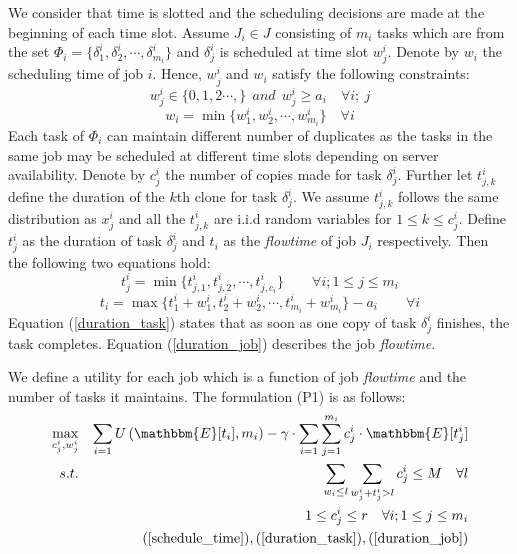 \documentclass[10pt,conference]{IEEEtran}
\begin{document}
We consider that time is slotted and the scheduling decisions are made at the beginning of  each time slot. Assume $J_i \in J$ consisting of $m_i$ tasks which are from the set $\Phi_i = \{\delta^i_1,\delta^i_2,\cdots,\delta^i_{m_i}\}$ and $\delta^i_j$ is scheduled at time slot $w^i_j$. Denote by $w_i$ the scheduling time of job $i$. Hence, $w^i_j$ and $w_i$ satisfy the following constraints:
\begin{equation}
w^i_j \in \{0,1,2\cdots,\} \ \ and \ \ w^i_j \geq a_i   \quad  \forall i; \ j
\label{schedule_time}
\end{equation}
\begin{equation}
w_i = \min\{w^i_1,w^i_2,\cdots,w^i_{m_i}\}   \quad  \forall i
\end{equation}
Each task of $\Phi_i$ can maintain different number of duplicates as the tasks in the same job may be scheduled at different time slots depending on server availability. Denote by $c^i_j$ the number of copies made for task $\delta^i_j$. Further let $t^i_{j,k}$ define the duration of the $k$th clone for task $\delta^i_j$. We assume $t^i_{j,k}$ follows the same distribution as $x^i_j$ and  all the $t^i_{j,k}$  are i.i.d random variables for $1\leq k \leq c^i_j$.  Define $t_j^i$ as the duration of task $\delta^i_j$ and $t_i$ as the \textit{flowtime} of job $J_i$ respectively.  Then the following two equations hold:
\begin{equation}
t^i_j =  \min\{t^i_{j,1}, t^i_{j,2}, \cdots, t^i_{j,c_i}\} \qquad \forall i; 1 \leq j \leq m_i
\label{duration_task}
\end{equation}
\begin{equation}
t_i =  \max\{t^i_{1} + w^i_1, t^i_{2} + w^i_2, \cdots, t^i_{m_i} + w^i_{m_i}\}  - a_i\qquad   \forall i
\label{duration_job}
\end{equation}
Equation (\ref{duration_task}) states that as soon as one copy of task $\delta^i_j$ finishes, the task completes. Equation (\ref{duration_job}) describes the job \textit{flowtime}.

We define a utility for each job which is a function of job \textit{flowtime} and the number of tasks it maintains. The formulation (P1) is as follows:
\begin{eqnarray*}
\max_{c^i_j,w^i_j}  &  &  \sum_{i = 1} U\left( \mathbbm{E}[t_i],m_i\right) - \gamma\cdot \sum_{i=1} \sum_{j=1}^{m_i}c^i_j\cdot \mathbbm{E}[t^i_j]\\
 s.t. &  & \sum_{w_i \leq l}\sum_{w^i_j + t^i_j > l}  c^i_j \leq M \quad \forall l \\
  &  &  1 \leq c^i_j \leq r \quad \forall  i;  1 \leq j \leq m_i\\
  & & (\ref{schedule_time}), (\ref{duration_task}), (\ref{duration_job})
\end{eqnarray*}
\end{document}
